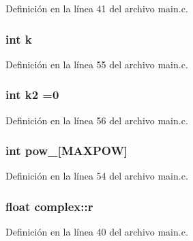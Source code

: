 Definición en la línea 41 del archivo main.\+c.

\subsubsection[{\texorpdfstring{k}{k}}]{\setlength{\rightskip}{0pt plus 5cm}int k}\hypertarget{group___main_gab66ed8e0098c0a86b458672a55a9cca9}{}\label{group___main_gab66ed8e0098c0a86b458672a55a9cca9}


Definición en la línea 55 del archivo main.\+c.

\subsubsection[{\texorpdfstring{k2}{k2}}]{\setlength{\rightskip}{0pt plus 5cm}int k2 =0}\hypertarget{group___main_ga57d44982ba52ca6e9a95be4998e5a646}{}\label{group___main_ga57d44982ba52ca6e9a95be4998e5a646}


Definición en la línea 56 del archivo main.\+c.

\subsubsection[{\texorpdfstring{pow\+\_\+2}{pow_2}}]{\setlength{\rightskip}{0pt plus 5cm}int pow\+\_\mbox{[}{\bf M\+A\+X\+P\+OW}\mbox{]}}\hypertarget{group___main_gae6e1b2e2df50cea4a448b3e1af0ef67c}{}\label{group___main_gae6e1b2e2df50cea4a448b3e1af0ef67c}


Definición en la línea 54 del archivo main.\+c.

\subsubsection[{\texorpdfstring{r}{r}}]{\setlength{\rightskip}{0pt plus 5cm}float complex\+::r}\hypertarget{group___main_ga6b24d5cc84eef41dbe90b79e93de030f}{}\label{group___main_ga6b24d5cc84eef41dbe90b79e93de030f}


Definición en la línea 40 del archivo main.\+c.

